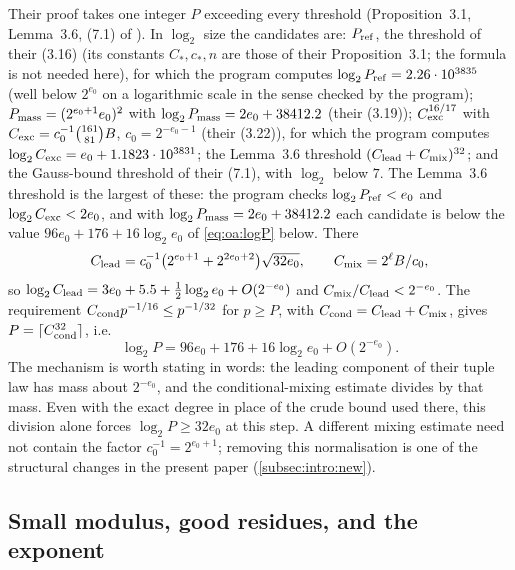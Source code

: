 Their proof takes one integer $P$ exceeding every threshold
(Proposition~3.1, Lemma~3.6, (7.1) of \cite{OpenAI}). In
$\log_2$ size the candidates are: $P_{\rm ref}$, the threshold
of their (3.16) (its constants $C_*,c_*,n$ are those of their
Proposition~3.1; the formula is not needed here), for which the
program computes $\log_2P_{\rm ref}=2.26\cdot10^{3835}$ (well
below $2^{e_0}$ on a logarithmic scale in the sense checked by the
program); $P_{\rm mass}=(2^{e_0+1}e_0)^2$ with
$\log_2P_{\rm mass}=2e_0+38412.2$ (their (3.19));
$C_{\rm exc}^{16/17}$ with $C_{\rm exc}=c_0^{-1}\binom{161}{81}B$,
$c_0=2^{-e_0-1}$ (their (3.22)), for which the program computes
$\log_2C_{\rm exc}=e_0+1.1823\cdot10^{3831}$; the Lemma~3.6 threshold
$(C_{\rm lead}+C_{\rm mix})^{32}$; and the Gauss-bound threshold of
their (7.1), with $\log_2$ below $7$. The Lemma~3.6 threshold is
the largest of these: the program checks $\log_2P_{\rm ref}<e_0$
and $\log_2C_{\rm exc}<2e_0$, and with
$\log_2P_{\rm mass}=2e_0+38412.2$ each candidate is below the
value $96e_0+176+16\log_2e_0$ of \eqref{eq:oa:logP} below. There
\begin{equation}\label{eq:oa:clead}
  C_{\rm lead}=c_0^{-1}\bigl(2^{e_0+1}+2^{2e_0+2}\bigr)\sqrt{32e_0},
  \qquad C_{\rm mix}=2^\ell B/c_0,
\end{equation}
so $\log_2C_{\rm lead}=3e_0+5.5+\tfrac12\log_2e_0+O(2^{-e_0})$ and
$C_{\rm mix}/C_{\rm lead}<2^{-e_0}$. The requirement
$C_{\rm cond}p^{-1/16}\le p^{-1/32}$ for $p\ge P$, with
$C_{\rm cond}=C_{\rm lead}+C_{\rm mix}$, gives
$P=\lceil C_{\rm cond}^{32}\rceil$, i.e.
\begin{equation}\label{eq:oa:logP}
  \log_2P=96e_0+176+16\log_2e_0+O(2^{-e_0}).
\end{equation}
The mechanism is worth stating in words: the leading component of
their tuple law has mass about $2^{-e_0}$, and the
conditional-mixing estimate divides by that mass. Even with the
exact degree in place of the crude bound used there, this division
alone forces $\log_2P\ge32e_0$ at this step. A different mixing
estimate need not contain the factor $c_0^{-1}=2^{e_0+1}$;
removing this normalisation
is one of the structural changes in the present paper
(\cref{subsec:intro:new}).

\subsection{Small modulus, good residues, and the exponent}\label{subsec:oa:exponent}

